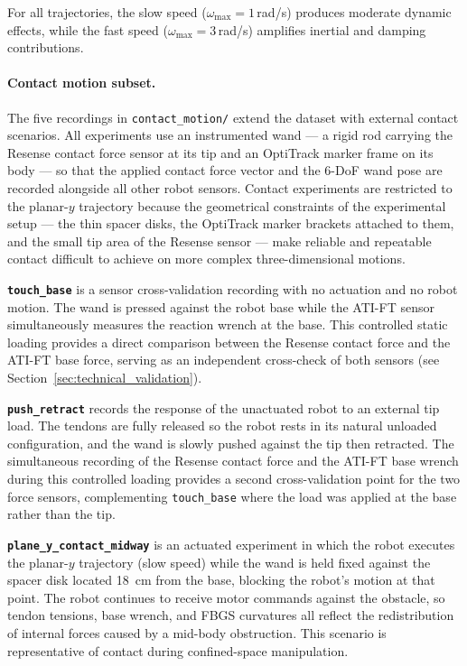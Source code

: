 \documentclass[14pt, a4paper]{article}
\begin{document}
For all trajectories, the slow speed ($\omega_{\max} = 1$\,rad/s) produces moderate dynamic effects, while the fast speed ($\omega_{\max} = 3$\,rad/s) amplifies inertial and damping contributions.

\paragraph{Contact motion subset.}
The five recordings in \texttt{contact\_motion/} extend the dataset with external contact scenarios.
All experiments use an instrumented wand — a rigid rod carrying the Resense contact force sensor at its tip and an OptiTrack marker frame on its body — so that the applied contact force vector and the 6-DoF wand pose are recorded alongside all other robot sensors.
Contact experiments are restricted to the planar-$y$ trajectory because the geometrical constraints of the experimental setup — the thin spacer disks, the OptiTrack marker brackets attached to them, and the small tip area of the Resense sensor — make reliable and repeatable contact difficult to achieve on more complex three-dimensional motions.

\textbf{\texttt{touch\_base}} is a sensor cross-validation recording with no actuation and no robot motion.
The wand is pressed against the robot base while the ATI-FT sensor simultaneously measures the reaction wrench at the base.
This controlled static loading provides a direct comparison between the Resense contact force and the ATI-FT base force, serving as an independent cross-check of both sensors (see Section~\ref{sec:technical_validation}).

\textbf{\texttt{push\_retract}} records the response of the unactuated robot to an external tip load.
The tendons are fully released so the robot rests in its natural unloaded configuration, and the wand is slowly pushed against the tip then retracted.
The simultaneous recording of the Resense contact force and the ATI-FT base wrench during this controlled loading provides a second cross-validation point for the two force sensors, complementing \texttt{touch\_base} where the load was applied at the base rather than the tip.

\textbf{\texttt{plane\_y\_contact\_midway}} is an actuated experiment in which the robot executes the planar-$y$ trajectory (slow speed) while the wand is held fixed against the spacer disk located \SI{18}{\centi\meter} from the base, blocking the robot's motion at that point.
The robot continues to receive motor commands against the obstacle, so tendon tensions, base wrench, and FBGS curvatures all reflect the redistribution of internal forces caused by a mid-body obstruction.
This scenario is representative of contact during confined-space manipulation.
\end{document}
